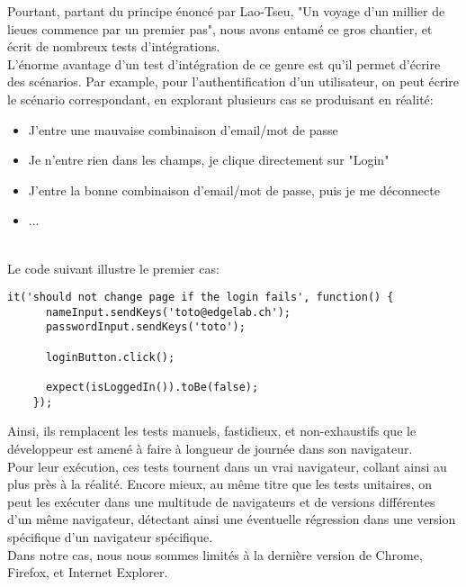\documentclass[a4paper,french,12pt]{article}
\begin{document}
	Pourtant, partant du principe énoncé par Lao-Tseu, "Un voyage d'un millier de lieues commence par un premier pas", nous avons entamé ce gros chantier, et écrit de nombreux tests d'intégrations.~\\	
	
	L'énorme avantage d'un test d'intégration de ce genre est qu'il permet d'écrire des scénarios. Par example, pour l'authentification d'un utilisateur, on peut écrire le scénario correspondant, en explorant plusieurs cas se produisant en réalité:~\\	

	\begin{itemize}
		\item J'entre une mauvaise combinaison d'email/mot de passe
		\item Je n'entre rien dans les champs, je clique directement sur "Login"
		\item J'entre la bonne combinaison d'email/mot de passe, puis je me déconnecte
		\item ...
	\end{itemize} ~\\
	
	Le code suivant illustre le premier cas: ~\\
	
	\begin{lstlisting}[caption=Test de connection à son compte avec Protractor]
	it('should not change page if the login fails', function() {
      nameInput.sendKeys('toto@edgelab.ch');
      passwordInput.sendKeys('toto');

      loginButton.click();

      expect(isLoggedIn()).toBe(false);
    });
	\end{lstlisting}
		
		
	Ainsi, ils remplacent les tests manuels, fastidieux, et non-exhaustifs que le développeur est amené à faire à longueur de journée dans son navigateur.~\\	
	
	Pour leur exécution, ces tests tournent dans un vrai navigateur, collant ainsi au plus près à la réalité. Encore mieux, au même titre que les tests unitaires, on peut les exécuter dans une multitude de navigateurs et de versions différentes d'un même navigateur, détectant ainsi une éventuelle régression dans une version spécifique d'un navigateur spécifique.~\\	
	
	Dans notre cas, nous nous sommes limités à la dernière version de Chrome, Firefox, et Internet Explorer.
	
\end{document}
